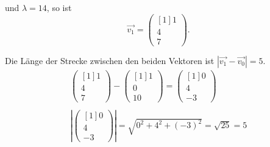 und $\displaystyle \lambda =14$, so ist
\begin{equation*}
	\overrightarrow{v_{1}} =\begin{pmatrix}[1]
		1\\
		4\\
		7
	\end{pmatrix}\text{.}
\end{equation*}


Die Länge der Strecke zwischen den beiden Vektoren ist $\displaystyle \left| \overrightarrow{v_{1}} -\overrightarrow{v_{0}}\right| =5$.
\begin{gather*}
	\begin{pmatrix}[1]
		1\\
		4\\
		7
	\end{pmatrix} -\begin{pmatrix}[1]
		1\\
		0\\
		10
	\end{pmatrix} =\begin{pmatrix}[1]
		0\\
		4\\
		-3
	\end{pmatrix}\\
	\\
	\left| \begin{pmatrix}[1]
		0\\
		4\\
		-3
	\end{pmatrix}\right| =\sqrt{0^{2} +4^{2} +( -3)^{2}} =\sqrt{25} =5
\end{gather*}
